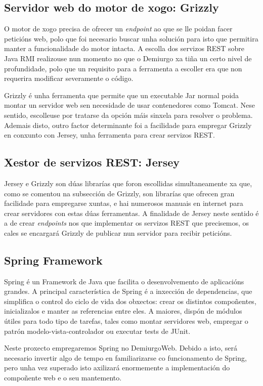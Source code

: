 \subsection{Servidor web do motor de xogo: Grizzly}
O motor de xogo precisa de ofrecer un \textit{endpoint} ao que se lle poidan
facer peticións web, polo que foi necesario buscar unha solución para isto que
permitira manter a funcionalidade do motor intacta. A escolla dos servizos REST
sobre Java RMI realizouse nun momento no que o Demiurgo xa tiña un certo nivel
de profundidade, polo que un requisito para a ferramenta a escoller era que non
requerira modificar severamente o código.
\par
Grizzly é unha ferramenta que permite que un executable Jar normal poida montar
un servidor web sen necesidade de usar contenedores como Tomcat. Nese sentido,
escolleuse por tratarse da opción máis sinxela para resolver o problema. Ademais
disto, outro factor determinante foi a facilidade para empregar Grizzly en
conxunto con Jersey, unha ferramenta para crear servizos REST.

\subsection{Xestor de servizos REST: Jersey}
Jersey e Grizzly son dúas librarías que foron escollidas simultaneamente xa que,
como se comentou na subsección de Grizzly, son librarías que ofrecen gran
facilidade para empregarse xuntas, e hai numerosos manuais en internet para
crear servidores con estas dúas ferramentas. A finalidade de Jersey neste
sentido é a de crear \textit{endpoints} nos que implementar os servizos REST que
precisemos, os cales se encargará Grizzly de publicar nun servidor para recibir
peticións.

\subsection{Spring Framework}
Spring é un Framework de Java que facilita o desenvolvemento de aplicacións
grandes. A principal característica de Spring é a inxección de dependencias, que
simplifica o control do ciclo de vida dos obxectos: crear os distintos
compoñentes, inicializalos e manter as referencias entre eles. A maiores, dispón
de módulos útiles para todo tipo de tarefas, tales como montar servidores web,
empregar o patrón modelo-vista-controlador ou executar tests de JUnit.
\par
Neste proxecto empregaremos Spring no DemiurgoWeb. Debido a isto, será necesario
invertir algo de tempo en familiarizarse co funcionamento de Spring, pero unha
vez superado isto axilizará enormemente a implementación do compoñente web e o
seu mantemento.

